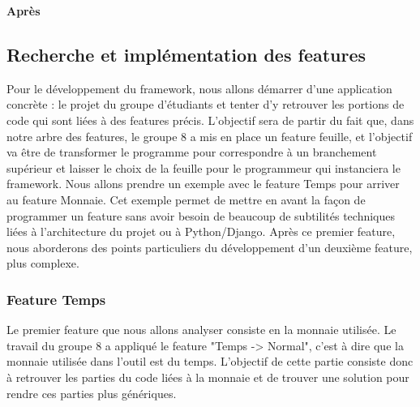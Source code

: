 \begin{description}
\begin{minipage}{.5\textwidth}
\begin{center}

\end{center}
\end{minipage}
\hspace{0.3cm}
\begin{minipage}{.5\textwidth}
\begin{center} \textbf{Après}\end{center}


\end{minipage}
\vspace{0.3cm}

\end{description}


\subsection{Recherche et implémentation des features}

Pour le développement du framework,  nous allons démarrer d'une application concrète : le projet du groupe d'étudiants et tenter d'y retrouver les portions de code qui sont liées à des features précis.  L'objectif sera de partir du fait que,  dans notre arbre des features,  le groupe 8 a mis en place un feature feuille,  et l'objectif va être de transformer le programme pour correspondre à un branchement supérieur et laisser le choix de la feuille pour le programmeur qui instanciera le framework.  Nous allons prendre un exemple avec le feature Temps pour arriver au feature Monnaie.  Cet exemple permet de mettre en avant la façon de programmer un feature sans avoir besoin de beaucoup de subtilités techniques liées à l'architecture du projet ou à Python/Django.  Après ce premier feature,  nous aborderons des points particuliers du développement d'un deuxième feature,  plus complexe.

\subsubsection{Feature Temps}

Le premier feature que nous allons analyser consiste en la monnaie utilisée.  Le travail du groupe 8 a appliqué le feature "Temps -> Normal",  c'est à dire que la monnaie utilisée dans l'outil est du temps.  L'objectif de cette partie consiste donc à retrouver les parties du code liées à la monnaie et de trouver une solution pour rendre ces parties plus génériques.

